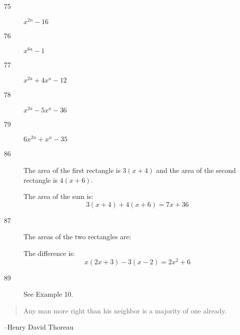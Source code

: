 \documentclass[letterpaper]{exam}
\begin{document}
\begin{description}
      \item[75] $x^{2n} - 16$

      \item[76] $x^{6a} - 1$

      \item[77] $x^{2a} + 4x^a - 12$

      \item[78] $x^{2a} - 5x^a - 36$

      \item[79] $6x^{2n} + x^n - 35$

      \item[86]
        The area of the first rectangle is $3(x + 4)$ and the area of the second rectangle is 
        $4(x + 6)$.  
        

        The area of the sum is: 
        \[ 
          3(x + 4) + 4(x + 6) = \boxed{ 7x + 36 } 
        \]

      \item[87]
        The areas of the two rectangles are:
        
        The difference is: 
        \[ 
          x(2x + 3) - 3(x - 2 )= \boxed{ 2x^2 + 6 } 
        \]

      \item[89]
        See Example 10.

    \end{description}
  \fi
  \ifprintanswers{}
  \else
    \vspace{11 cm}
    \begin{quote}
      \begin{em}
        Any man more right than his neighbor is a majority of one already.
      \end{em}
    \end{quote}
    \hspace{2 cm}--Henry David Thoreau
  \fi
\end{document}

